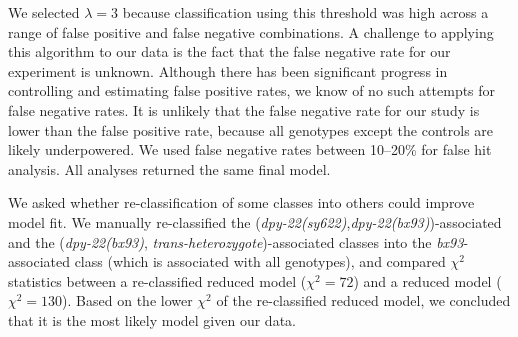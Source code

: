 \documentclass[9pt,twocolumn,twoside]{gsajnl}
\newcommand{\gene}[1]{\mbox{\emph{#1}}}
\newcommand{\dpy}[1]{\gene{dpy-22#1}}
\newcommand{\bx}{\dpy{(bx93)}}
\newcommand{\sy}{\dpy{(sy622)}}
\begin{document}
We selected $\lambda=3$ because classification using this threshold was high
across a range of false positive and false negative combinations. A challenge to
applying this algorithm to our data is the fact that the false negative rate for
our experiment is unknown. Although there has been significant progress in
controlling and estimating false positive rates, we know of no such attempts for
false negative rates. It is unlikely that the false negative rate for our study
is lower than the false positive rate, because all genotypes except the controls
are likely underpowered. We used false negative rates between 10--20\% for false
hit analysis. All analyses returned the same final model.

We asked whether re-classification of some classes into others could improve
model fit. We manually re-classified the (\sy{},\bx{})-associated and the (\bx,
\emph{trans-heterozygote})-associated classes into the \emph{bx93}-associated
class (which is associated with all genotypes), and compared $\chi^2$ statistics
between a re-classified reduced model ($\chi^2=72$) and a reduced model
($\chi^2=130$). Based on the lower $\chi^2$ of the re-classified reduced model,
we concluded that it is the most likely model given our data.
\end{document}
